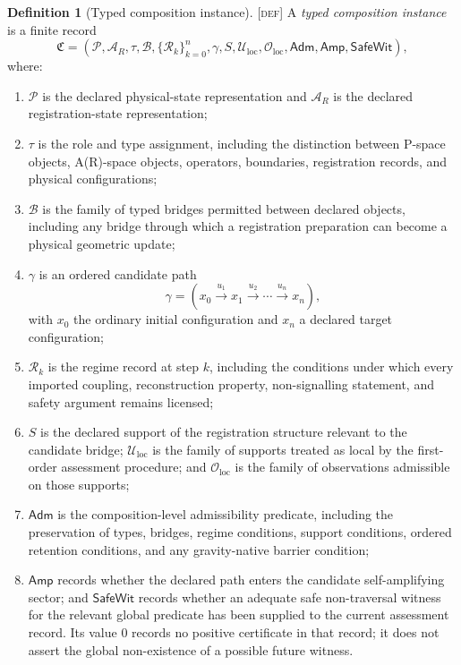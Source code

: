 \documentclass[11pt]{article}
\newcommand{\Pspace}{\ensuremath{\mathcal{P}}}
\newcommand{\ARspace}{\ensuremath{\mathcal{A}_{R}}}
\newcommand{\Defn}{\textsc{[def]}}
\theoremstyle{definition}
\newtheorem{sdefinition}{Definition}
\begin{document}
\begin{sdefinition}[Typed composition instance]
\label{def:typed-composition-instance}
\Defn{} A \emph{typed composition instance} is a finite record
\begin{equation}
\mathfrak C
=
\left(
\Pspace,\ARspace,\tau,\mathcal B,
\{\mathcal R_k\}_{k=0}^{n},
\gamma,S,\mathcal U_{\mathrm{loc}},
\mathcal O_{\mathrm{loc}},
\mathsf{Adm},\mathsf{Amp},\mathsf{SafeWit}
\right),
\label{eq:typed-composition-instance}
\end{equation}
where:
\begin{enumerate}
\item $\Pspace$ is the declared physical-state representation and
$\ARspace$ is the declared registration-state representation;

\item $\tau$ is the role and type assignment, including the distinction
between P-space objects, A(R)-space objects, operators, boundaries,
registration records, and physical configurations;

\item $\mathcal B$ is the family of typed bridges permitted between declared
objects, including any bridge through which a registration preparation can
become a physical geometric update;

\item $\gamma$ is an ordered candidate path
\begin{equation}
\gamma
=
\left(
x_0
\xrightarrow{u_1}
x_1
\xrightarrow{u_2}
\cdots
\xrightarrow{u_n}
x_n
\right),
\label{eq:ordered-path}
\end{equation}
with $x_0$ the ordinary initial configuration and $x_n$ a declared target
configuration;

\item $\mathcal R_k$ is the regime record at step $k$, including the
conditions under which every imported coupling, reconstruction property,
non-signalling statement, and safety argument remains licensed;

\item $S$ is the declared support of the registration structure relevant to
the candidate bridge; $\mathcal U_{\mathrm{loc}}$ is the family of supports
treated as local by the first-order assessment procedure; and
$\mathcal O_{\mathrm{loc}}$ is the family of observations admissible on those
supports;

\item $\mathsf{Adm}$ is the composition-level admissibility predicate,
including the preservation of types, bridges, regime conditions, support
conditions, ordered retention conditions, and any gravity-native barrier
condition;

\item $\mathsf{Amp}$ records whether the declared path enters the candidate
self-amplifying sector; and $\mathsf{SafeWit}$ records whether an adequate safe
non-traversal witness for the relevant global predicate has been supplied to the
current assessment record. Its value $0$ records no positive certificate in that
record; it does not assert the global non-existence of a possible future witness.
\end{enumerate}
\end{sdefinition}
\end{document}
